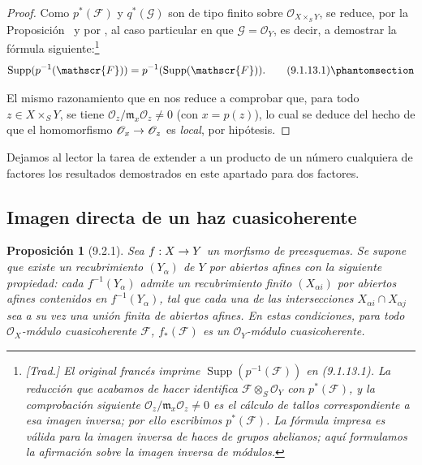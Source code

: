 \documentclass[oneside]{amsart}
\theoremstyle{ega-env-style}
\theoremstyle{ega-thm-env-style}
\newtheorem*{proposition}{Proposición}
\theoremstyle{ega-defn-env-style}
\def\mathcal{\mathscr}
\def\sh{\mathcal}                   %
\def\Supp{\operatorname{Supp}}
\renewcommand{\to}{\mathchoice{\longrightarrow}{\rightarrow}{\rightarrow}{\rightarrow}}
\let\EGAOriginalLabel\label
\renewcommand{\label}[1]{\phantomsection\EGAOriginalLabel{#1}}
\begin{document}
\begin{proof}
Como $p^*(\mathscr{F})$ y $q^*(\mathscr{G})$ son de tipo finito sobre
$\mathscr{O}_{X\times_S Y}$, se reduce, por la Proposición~ y
por , al caso particular en que $\mathscr{G}=\mathscr{O}_Y$, es
decir, a demostrar la fórmula siguiente:\footnote{\emph{[Trad.] El
original francés imprime $\Supp(p^{-1}(\sh{F}))$ en (9.1.13.1). La reducción
que acabamos de hacer identifica $\sh{F}\otimes_S\sh{O}_Y$ con $p^*(\sh{F})$, y la
comprobación siguiente $\sh{O}_z/\mathfrak{m}_x\sh{O}_z\neq0$ es el cálculo
de tallos correspondiente a esa imagen inversa; por ello escribimos $p^*(\sh{F})$.
La fórmula impresa es válida para la imagen inversa de haces de grupos abelianos; aquí formulamos la afirmación sobre la imagen inversa de módulos.}}
\[
  \operatorname{Supp}(p^{-1}(\mathscr{F}))
  =p^{-1}(\operatorname{Supp}(\mathscr{F})).
  \tag{9.1.13.1}\label{I.9.1.13.1-fr}
\]

El mismo razonamiento que en  nos reduce a comprobar que, para todo
$z\in X\times_S Y$, se tiene $\mathscr{O}_z/\mathfrak{m}_x\mathscr{O}_z\neq0$ (con $x=p(z)$),
lo cual se deduce del hecho de que el homomorfismo $\mathscr{O}_x\to\mathscr{O}_z$ es \emph{local},
por hipótesis.
\end{proof}

Dejamos al lector la tarea de extender a un producto de un número cualquiera
de factores los resultados demostrados en este apartado para dos factores.

\subsection{Imagen directa de un haz cuasicoherente}
\label{subsection:I.9.2}

\begin{proposition}[9.2.1]
\label{I.9.2.1}
Sea $f:X\to Y$ un morfismo de preesquemas. Se supone que existe un
recubrimiento $(Y_\alpha)$ de $Y$ por abiertos afines con la siguiente
propiedad: cada $f^{-1}(Y_\alpha)$ admite un recubrimiento
\emph{finito} $(X_{\alpha i})$ por abiertos afines contenidos en
$f^{-1}(Y_\alpha)$, tal que cada una de las intersecciones
$X_{\alpha i}\cap X_{\alpha j}$ sea a su vez una unión \emph{finita} de
abiertos afines. En estas condiciones, para todo $\mathscr{O}_X$-módulo
cuasicoherente $\mathscr{F}$, $f_*(\mathscr{F})$ es un $\mathscr{O}_Y$-módulo
cuasicoherente.
\end{proposition}
\end{document}
